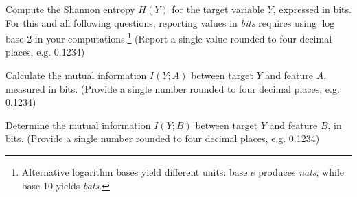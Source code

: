 \documentclass[11pt,addpoints,answers]{exam}
\begin{document}
	
	\begin{questions}
		\item[(1)] Compute the Shannon entropy \(H(Y)\) for the target variable \(Y\), expressed in bits. For this and all following questions, reporting values in \emph{bits} requires using \(\log\) base 2 in your computations.\footnote{Alternative logarithm bases yield different units: base \(e\) produces \emph{nats}, while base 10 yields \emph{bats}.} (Report a single value rounded to four decimal places, e.g. 0.1234)
		
		\begin{minipage}[t]{0.25\textwidth}
			\begin{answer_box}[title=$H(Y)$]
			\end{answer_box}
		\end{minipage}
		\begin{minipage}[t]{0.7\textwidth}
			\begin{answer_box}[title=Work]
			\end{answer_box}
		\end{minipage}
		
		
		\item[(2)] Calculate the mutual information \(I(Y; A)\) between target \(Y\) and feature \(A\), measured in bits. (Provide a single number rounded to four decimal places, e.g. 0.1234)
		
		\begin{minipage}[t]{0.25\textwidth}
			\begin{answer_box}[title=$I(Y;A)$]
			\end{answer_box}
		\end{minipage}
		\begin{minipage}[t]{0.7\textwidth}
			\begin{answer_box}[title=Work]
			\end{answer_box}
		\end{minipage}
		
		
		\item[(3)] Determine the mutual information \(I(Y; B)\) between target \(Y\) and feature \(B\), in bits. (Provide a single number rounded to four decimal places, e.g. 0.1234)
		
		\begin{minipage}[t]{0.25\textwidth}
			\begin{answer_box}[title=$I(Y;B)$]
			\end{answer_box}
		\end{minipage}
		\begin{minipage}[t]{0.7\textwidth}
			\begin{answer_box}[title=Work]
			\end{answer_box}
		\end{minipage}
		

\end{questions}
\end{document}
